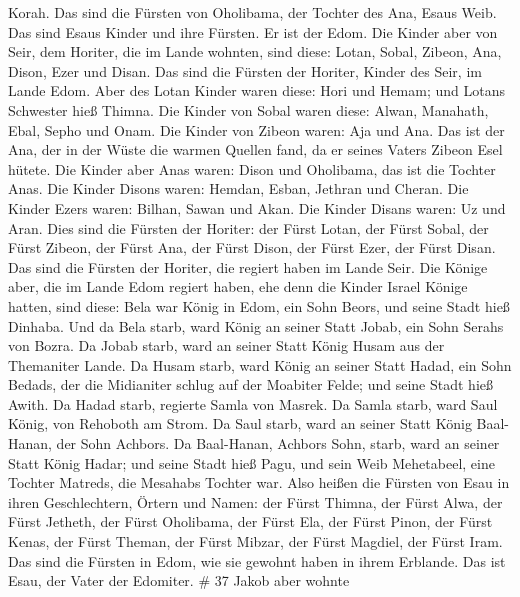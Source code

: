 Korah. Das sind die Fürsten von Oholibama, der Tochter des Ana, Esaus
Weib.  Das sind Esaus Kinder und ihre Fürsten. Er ist der
Edom.  Die Kinder aber von Seir, dem Horiter, die im Lande
wohnten, sind diese: Lotan, Sobal, Zibeon, Ana, Dison, Ezer und Disan.
 Das sind die Fürsten der Horiter, Kinder des Seir, im
Lande Edom.  Aber des Lotan Kinder waren diese: Hori und
Hemam; und Lotans Schwester hieß Thimna.  Die Kinder von
Sobal waren diese: Alwan, Manahath, Ebal, Sepho und Onam. 
Die Kinder von Zibeon waren: Aja und Ana. Das ist der Ana, der in der
Wüste die warmen Quellen fand, da er seines Vaters Zibeon Esel hütete.
 Die Kinder aber Anas waren: Dison und Oholibama, das ist
die Tochter Anas.  Die Kinder Disons waren: Hemdan, Esban,
Jethran und Cheran.  Die Kinder Ezers waren: Bilhan, Sawan
und Akan.  Die Kinder Disans waren: Uz und Aran.
 Dies sind die Fürsten der Horiter: der Fürst Lotan, der
Fürst Sobal, der Fürst Zibeon, der Fürst Ana,  der Fürst
Dison, der Fürst Ezer, der Fürst Disan. Das sind die Fürsten der
Horiter, die regiert haben im Lande Seir.  Die Könige aber,
die im Lande Edom regiert haben, ehe denn die Kinder Israel Könige
hatten, sind diese:  Bela war König in Edom, ein Sohn
Beors, und seine Stadt hieß Dinhaba.  Und da Bela starb,
ward König an seiner Statt Jobab, ein Sohn Serahs von Bozra.
 Da Jobab starb, ward an seiner Statt König Husam aus der
Themaniter Lande.  Da Husam starb, ward König an seiner
Statt Hadad, ein Sohn Bedads, der die Midianiter schlug auf der Moabiter
Felde; und seine Stadt hieß Awith.  Da Hadad starb,
regierte Samla von Masrek.  Da Samla starb, ward Saul
König, von Rehoboth am Strom.  Da Saul starb, ward an
seiner Statt König Baal-Hanan, der Sohn Achbors.  Da
Baal-Hanan, Achbors Sohn, starb, ward an seiner Statt König Hadar; und
seine Stadt hieß Pagu, und sein Weib Mehetabeel, eine Tochter Matreds,
die Mesahabs Tochter war.  Also heißen die Fürsten von Esau
in ihren Geschlechtern, Örtern und Namen: der Fürst Thimna, der Fürst
Alwa, der Fürst Jetheth,  der Fürst Oholibama, der Fürst
Ela, der Fürst Pinon,  der Fürst Kenas, der Fürst Theman,
der Fürst Mibzar,  der Fürst Magdiel, der Fürst Iram. Das
sind die Fürsten in Edom, wie sie gewohnt haben in ihrem Erblande. Das
ist Esau, der Vater der Edomiter. \# 37  Jakob aber wohnte
